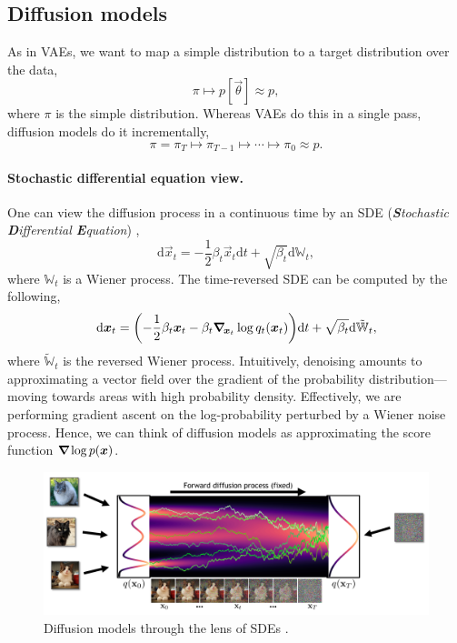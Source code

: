 \subsection{Diffusion models}

As in VAEs, we want to map a simple distribution to a target distribution over the data, \[
    \pi \mapsto p[\vec{\theta}] \approx p,
\]
where $\pi$ is the simple distribution. Whereas VAEs do this in a single pass, diffusion models do it incrementally, \[
    \pi = \pi_T \mapsto \pi_{T-1} \mapsto \cdots \mapsto \pi_0 \approx p.
\]

\paragraph{Stochastic differential equation view.}

One can view the diffusion process in a continuous time by an SDE (\textit{\textbf{S}tochastic
\textbf{D}ifferential \textbf{E}quation}) \citep{song2019generative,song2020score}, \[
    \mathrm{d}\vec{x}_t = -\frac{1}{2} \beta_t \vec{x}_t \mathrm{d}t + \sqrt{\beta_t} \mathrm{d}\mathbb{W}_t,
\]
where $\mathbb{W}_t$ is a Wiener process. The time-reversed SDE can be computed by the following, \[
    \mathrm{d}\vec{x}_t = \lft( -\frac{1}{2} \beta_t \vec{x}_t - \beta_t \grad{\log q_t(\vec{x}_t)}{\vec{x}_t} \rgt) \mathrm{d}t + \sqrt{\beta_t} \mathrm{d} \tilde{\mathbb{W}}_t,
\]
where $\tilde{\mathbb{W}}_t$ is the reversed Wiener process. Intuitively, denoising amounts to
approximating a vector field over the gradient of the probability distribution---moving towards areas
with high probability density. Effectively, we are performing gradient ascent on the log-probability
perturbed by a Wiener noise process. Hence, we can think of diffusion models as approximating the
score function $\bm{\nabla}_{\! } \log p(\bm{x})$.

\begin{figure}[h]
    \centering
    \includegraphics[width=\textwidth]{figures/sde}
    \caption{Diffusion models through the lens of SDEs \citep{song2020score}.}
    \label{fig:sde}
\end{figure}

